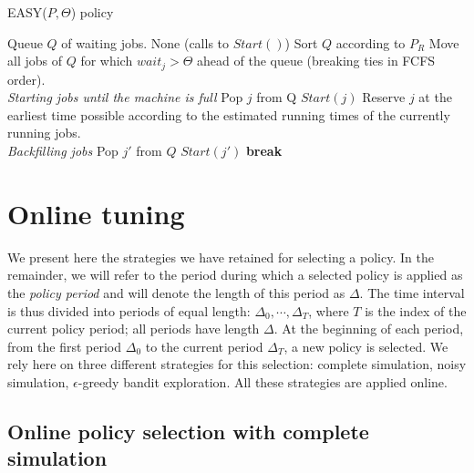 \documentclass[sigconf]{acmart}
\begin{document}
\begin{algorithm}[h]
  \caption{EASY($P,\Theta$) policy}
  \begin{algorithmic}[1]
    \renewcommand{\algorithmicrequire}{\textbf{Input:}}
    \renewcommand{\algorithmicensure}{\textbf{Output:}}
    \REQUIRE Queue $Q$ of waiting jobs.
    \ENSURE None (calls to $Start()$)
    \STATE Sort $Q$ according to $P_R$
    \STATE Move all jobs of $Q$ for which $wait_j > \Theta$ ahead
    of the queue (breaking ties in FCFS order).
    \\ \textit{Starting jobs until the machine is full}
    \STATE Pop $j$ from Q
    \STATE $Start(j)$
    \ELSE
    \STATE Reserve $j$ at the earliest
    time possible according to the estimated running times
    of the currently running jobs.
    \\ \textit{Backfilling jobs}
    \STATE Pop $j'$ from $Q$
    \STATE $Start(j')$
    \ENDIF
    \ENDFOR
    \STATE \textbf{break}
    \ENDIF
    \ENDFOR
  \end{algorithmic}
  \label{alg:EASY}
\end{algorithm}

\section{Online tuning}
\label{sec:online}

We present here the strategies we have retained for selecting a policy. In the remainder, we will refer to the period during which a selected policy is applied as the \textit{policy period} and will denote the length of this period as $\Delta$. The time interval is thus divided into periods of equal length: $\Delta_0, \cdots, \Delta_T$, where $T$ is the index of the current policy period; all periods have length $\Delta$. At the beginning of each period, from the first period $\Delta_0$ to the current period $\Delta_T$, a new policy is selected. We rely here on three different strategies for this selection: complete simulation, noisy simulation, $\epsilon$-greedy bandit exploration. All these strategies are applied online.

\subsection{Online policy selection with complete simulation}
\label{sub:feedback}
\end{document}
